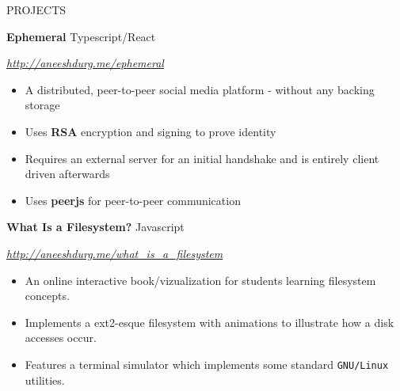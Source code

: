 \documentclass[paper=a4,fontsize=10pt]{scrartcl} %
\newcommand{\sepspace}{\vspace*{1em}}		%
\newcommand{\NewPart}[1]{ \noindent \large \usefont{OT1}{phv}{b}{n}\uppercase{#1} \normalfont \normalsize}
\newcommand{\EducationEntry}[4]{
		\noindent \textbf{#1}     %
			\hfill#2 \par  %
		\noindent \textit{#3} \par        %
		\noindent\hangafter=0 \small #4 %
		\normalsize \par}
\begin{document}
\begin{minipage}[t]{0.75\textwidth}
%



\sepspace
\sepspace
\NewPart{Projects}{}

\EducationEntry{Ephemeral}{Typescript/React}{\url{http://aneeshdurg.me/ephemeral}}{
\begin{itemize}
\item A distributed, peer-to-peer social media platform - without any backing storage
\item Uses \textbf{RSA} encryption and signing to prove identity
\item Requires an external server for an initial handshake and is entirely client driven afterwards
\item Uses \textbf{peerjs} for peer-to-peer communication
\end{itemize}
}
\sepspace

\EducationEntry{What Is a Filesystem?}{Javascript}{\url{http://aneeshdurg.me/what_is_a_filesystem}}{
\begin{itemize}
\item An online interactive book/vizualization for students learning filesystem concepts.
\item Implements a ext2-esque filesystem with animations to illustrate how a disk accesses occur.
\item Features a terminal simulator which implements some standard \texttt{GNU/Linux} utilities.%
\end{itemize}
}
\sepspace


\end{minipage}
\end{document}
